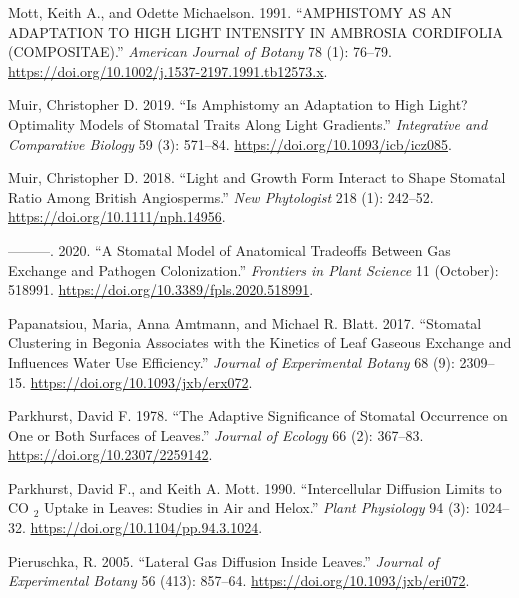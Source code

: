 \documentclass[12pt,halfline,a4paper,]{ouparticle}
\newlength{\cslhangindent}
\newlength{\cslentryspacingunit} %
\newenvironment{CSLReferences}[2] %
 {%
  \setlength{\parindent}{0pt}
  \ifodd #1
  \let\oldpar\par
  \def\par{\hangindent=\cslhangindent\oldpar}
  \fi
  \setlength{\parskip}{#2\cslentryspacingunit}
 }%
 {}
\begin{document}
\begin{CSLReferences}{1}{0}
\leavevmode{}%
Mott, Keith A., and Odette Michaelson. 1991. {``{AMPHISTOMY} {AS} {AN}
{ADAPTATION} {TO} {HIGH} {LIGHT} {INTENSITY} {IN} {AMBROSIA}
{CORDIFOLIA} ({COMPOSITAE}).''} \emph{American Journal of Botany} 78
(1): 76--79. \url{https://doi.org/10.1002/j.1537-2197.1991.tb12573.x}.

\leavevmode{}%
Muir, Christopher D. 2019. {``Is {Amphistomy} an {Adaptation} to {High}
{Light}? {Optimality} {Models} of {Stomatal} {Traits} Along {Light}
{Gradients}.''} \emph{Integrative and Comparative Biology} 59 (3):
571--84. \url{https://doi.org/10.1093/icb/icz085}.

\leavevmode{}%
Muir, Christopher D. 2018. {``Light and Growth Form Interact to Shape
Stomatal Ratio Among {British} Angiosperms.''} \emph{New Phytologist}
218 (1): 242--52. \url{https://doi.org/10.1111/nph.14956}.

\leavevmode{}%
---------. 2020. {``A {Stomatal} {Model} of {Anatomical} {Tradeoffs}
{Between} {Gas} {Exchange} and {Pathogen} {Colonization}.''}
\emph{Frontiers in Plant Science} 11 (October): 518991.
\url{https://doi.org/10.3389/fpls.2020.518991}.

\leavevmode{}%
Papanatsiou, Maria, Anna Amtmann, and Michael R. Blatt. 2017.
{``Stomatal Clustering in {Begonia} Associates with the Kinetics of Leaf
Gaseous Exchange and Influences Water Use Efficiency.''} \emph{Journal
of Experimental Botany} 68 (9): 2309--15.
\url{https://doi.org/10.1093/jxb/erx072}.

\leavevmode{}%
Parkhurst, David F. 1978. {``The {Adaptive} {Significance} of {Stomatal}
{Occurrence} on {One} or {Both} {Surfaces} of {Leaves}.''} \emph{Journal
of Ecology} 66 (2): 367--83. \url{https://doi.org/10.2307/2259142}.

\leavevmode{}%
Parkhurst, David F., and Keith A. Mott. 1990. {``Intercellular
{Diffusion} {Limits} to {CO} \(_{\textrm{2}}\) {Uptake} in {Leaves}:
{Studies} in {Air} and {Helox}.''} \emph{Plant Physiology} 94 (3):
1024--32. \url{https://doi.org/10.1104/pp.94.3.1024}.

\leavevmode{}%
Pieruschka, R. 2005. {``Lateral Gas Diffusion Inside Leaves.''}
\emph{Journal of Experimental Botany} 56 (413): 857--64.
\url{https://doi.org/10.1093/jxb/eri072}.


\end{CSLReferences}
\end{document}
